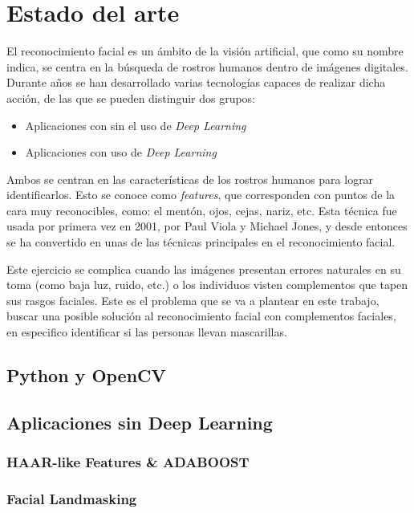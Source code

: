 
\chapter{Estado del arte}

El reconocimiento facial es un ámbito de la visión artificial, que como su nombre indica, se centra en la búsqueda de rostros humanos dentro de imágenes digitales. Durante años se han desarrollado varias tecnologías capaces de realizar dicha acción, de las que se pueden distinguir dos grupos:

\begin{itemize}
	\item Aplicaciones con sin el uso de \textit{Deep Learning}
	\item Aplicaciones con uso de \textit{Deep Learning}
\end{itemize}

Ambos se centran en las características de los rostros humanos para lograr identificarlos. Esto se conoce como \textit{features}, que corresponden con puntos de la cara muy reconocibles, como: el mentón, ojos, cejas, nariz, etc. Esta técnica fue usada por primera vez en 2001, por Paul Viola y Michael Jones, y desde entonces se ha convertido en unas de las técnicas principales en el reconocimiento facial.

Este ejercicio se complica cuando las imágenes presentan errores naturales en su toma (como baja luz, ruido, etc.) o los individuos visten complementos que tapen sus rasgos faciales. Este es el problema que se va a plantear en este trabajo, buscar una posible solución al reconocimiento facial con complementos faciales, en especifico identificar si las personas llevan mascarillas.

\section{Python y OpenCV}


\section{Aplicaciones sin Deep Learning}


\subsection*{HAAR-like Features \& ADABOOST}


\subsection*{Facial Landmasking}


